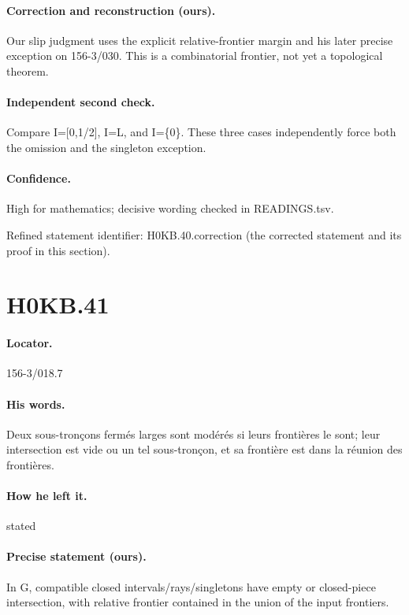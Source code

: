 \paragraph{Correction and reconstruction (ours).} Our slip judgment uses the explicit relative-frontier margin and his later precise exception on 156-3/030. This is a combinatorial frontier, not yet a topological theorem.

\paragraph{Independent second check.} Compare I=[0,1/2], I=L, and I=\{0\}. These three cases independently force both the omission and the singleton exception.

\paragraph{Confidence.} High for mathematics; decisive wording checked in READINGS.tsv.

\noindent Refined statement identifier: H0KB.40.correction (the corrected statement and its proof in this section).

\section*{H0KB.41}\label{statement:H0KB.41}
\paragraph{Locator.} 156-3/018.7

\paragraph{His words.} Deux sous-tronçons fermés larges sont modérés si leurs frontières le sont; leur intersection est vide ou un tel sous-tronçon, et sa frontière est dans la réunion des frontières.

\paragraph{How he left it.} stated

\paragraph{Precise statement (ours).} In G, compatible closed intervals/rays/singletons have empty or closed-piece intersection, with relative frontier contained in the union of the input frontiers.

